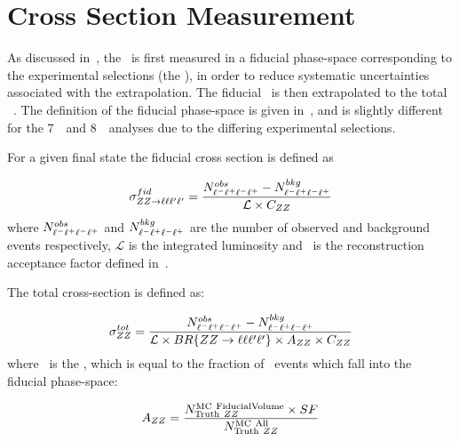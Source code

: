 \section{Cross Section Measurement}

As discussed in~\sec{}, the \cx\ is first measured in a fiducial phase-space
corresponding to the experimental selections (the ), in
order to reduce systematic uncertainties associated with the extrapolation. The
fiducial \cx\ is then extrapolated to the total \ZZ\ \cx. The definition of the
fiducial phase-space is given in~\sec{}, and is slightly different for the
7~\tev\ and 8~\tev\ analyses due to the differing experimental selections.

For a given \zzllll final state the fiducial cross section is defined as

\begin{equation}\label{eq:xsecfid_fourl}
\sigma_{ZZ\rightarrow\ell\ell\ell'\ell'}^{fid} = \frac{
N^{obs}_{\ell^{-}\ell^{+}\ell^{-}\ell^{+}} - N^{bkg}_{\ell^{-}\ell^{+}\ell^{-}\ell^{+}}}{\mathcal{L} \times C_{ZZ}}
\end{equation}
where $N^{obs}_{\ell^{-}\ell^{+}\ell^{-}\ell^{+}}$ and $N^{bkg}_{\ell^{-}\ell^{+}\ell^{-}\ell^{+}}$ are the number of observed and
background events respectively, $\mathcal{L}$ is the integrated luminosity and
\CZZ\ is the reconstruction acceptance factor defined in~.  

The total cross-section is defined as:

\begin{equation}\label{eq:xsectot_fourl}
\sigma_{ZZ}^{tot} = \frac{ N^{obs}_{\ell^{-}\ell^{+}\ell^{-}\ell^{+}} - N^{bkg}_{\ell^{-}\ell^{+}\ell^{-}\ell^{+}}}{\mathcal{L} \times
BR\{ZZ\rightarrow\ell\ell\ell'\ell'\} \times A_{ZZ} \times C_{ZZ}}
\end{equation}
where \AZZ\ is the , which is equal to the
fraction of \ZZ\ events which fall into the fiducial phase-space:

\begin{equation}
A_{ZZ} = \frac{ N^{\rm MC\ Fiducial Volume}_{{\rm Truth}\ ZZ} \times
SF }{ N^{{\rm MC\ All}}_{{\rm Truth}\ ZZ} }
\end{equation}


